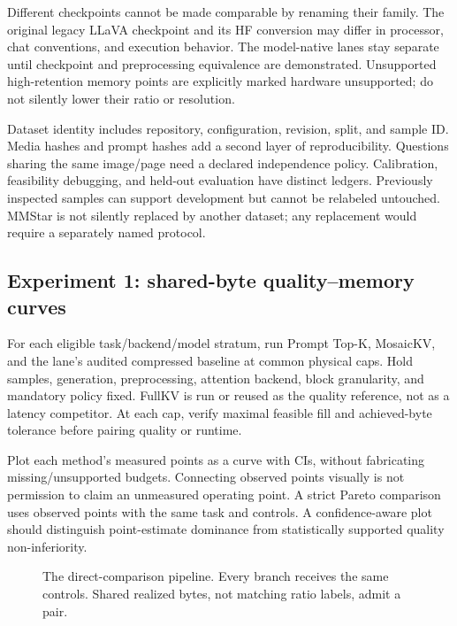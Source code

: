 Different checkpoints cannot be made comparable by renaming their family.
The original legacy LLaVA checkpoint and its HF conversion may differ in
processor, chat conventions, and execution behavior. The model-native lanes
stay separate until checkpoint and preprocessing equivalence are demonstrated.
Unsupported high-retention memory points are explicitly marked hardware
unsupported; do not silently lower their ratio or resolution.

Dataset identity includes repository, configuration, revision, split, and
sample ID. Media hashes and prompt hashes add a second layer of reproducibility.
Questions sharing the same image/page need a declared independence policy.
Calibration, feasibility debugging, and held-out evaluation have distinct
ledgers. Previously inspected samples can support development but cannot be
relabeled untouched. MMStar is not silently replaced by another dataset; any
replacement would require a separately named protocol.

\subsection{Experiment 1: shared-byte quality--memory curves}
For each eligible task/backend/model stratum, run Prompt Top-K, MosaicKV, and
the lane's audited compressed baseline at common physical caps. Hold samples,
generation, preprocessing, attention backend, block granularity, and mandatory
policy fixed. FullKV is run or reused as the quality reference, not as a latency
competitor. At each cap, verify maximal feasible fill and achieved-byte
tolerance before pairing quality or runtime.

Plot each method's measured points as a curve with CIs, without fabricating
missing/unsupported budgets. Connecting observed points visually is not
permission to claim an unmeasured operating point. A strict Pareto comparison
uses observed points with the same task and controls. A confidence-aware plot
should distinguish point-estimate dominance from statistically supported
quality non-inferiority.

\begin{figure}[h]
\centering
\caption{The direct-comparison pipeline. Every branch receives the same
controls. Shared realized bytes, not matching ratio labels, admit a pair.}
\end{figure}

